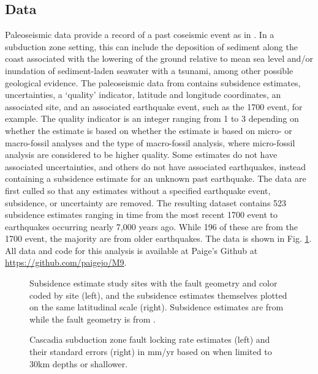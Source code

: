 {\subsection{Data}
\label{data}
Paleoseismic data provide a record of a past coseismic event as in \citet{leonard2010}.  In a subduction zone setting, this can include the deposition of sediment along the coast associated with the lowering of the ground relative to mean sea level and/or inundation of sediment-laden seawater with a tsunami, among other possible geological evidence.  The paleoseismic data from \citet{leonard2010} contains subsidence estimates, uncertainties, a `quality' indicator, latitude and longitude coordinates, an associated site, and an associated earthquake event, such as the 1700 event, for example.  The quality indicator is an integer ranging from 1 to 3 depending on whether the estimate is based on whether the estimate is based on micro- or macro-fossil analyses and the type of macro-fossil analysis, where micro-fossil analysis are considered to be higher quality.  Some estimates do not have associated uncertainties, and others do not have associated earthquakes, instead containing a subsidence estimate for an unknown past earthquake.  The data are first culled so that any estimates without a specified earthquake event, subsidence, or uncertainty are removed.  The resulting dataset contains 523 subsidence estimates ranging in time from the most recent 1700 event to earthquakes occurring nearly 7,000 years ago.  While 196 of these are from the 1700 event, the majority are from older earthquakes.  The data is shown in Fig. \ref{subsidence}.  All data and code for this analysis is available at Paige's Github at \url{https://github.com/paigejo/M9}.

\begin{figure}
\centering
{}
\caption{Subsidence estimate study sites with the fault geometry and color coded by site (left), and the subsidence estimates themselves plotted on the same latitudinal scale (right).  Subsidence estimates are from \citet{leonard2010} while the fault geometry is from \citet{faultGeom}.}
\label{subsidence}
\end{figure}

\begin{figure}
\centering
{}
\caption{Cascadia subduction zone fault locking rate estimates (left) and their standard errors (right) in mm/yr based on \citet{evans2015} when limited to 30km depths or shallower.}
\label{locking}
\end{figure}

}
